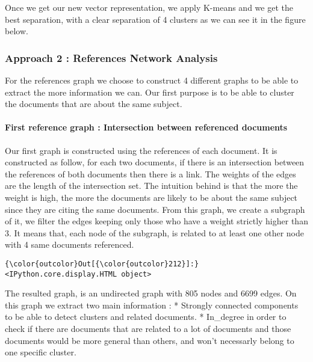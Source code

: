 \documentclass[journal,twocolumn]{IEEEtran}
\begin{document}
Once we get our new vector representation, we apply K-means and we get
the best separation, with a clear separation of 4 clusters as we can see
it in the figure below.


    \begin{figure}
        \begin{center}\end{center}
        \caption{}
        \label{}
    \end{figure}
    
    \subsubsection{Approach 2 : References Network
Analysis}\label{approach-2-references-network-analysis}

For the references graph we choose to construct 4 different graphs to be
able to extract the more information we can. Our first purpose is to be
able to cluster the documents that are about the same subject.

    \paragraph{First reference graph : Intersection between referenced
documents}\label{first-reference-graph-intersection-between-referenced-documents}

Our first graph is constructed using the references of each document. It
is constructed as follow, for each two documents, if there is an
intersection between the references of both documents then there is a
link. The weights of the edges are the length of the intersection set.
The intuition behind is that the more the weight is high, the more the
documents are likely to be about the same subject since they are citing
the same documents. From this graph, we create a subgraph of it, we
filter the edges keeping only those who have a weight strictly higher
than 3. It means that, each node of the subgraph, is related to at least
one other node with 4 same documents referenced.



\begin{Verbatim}[commandchars=\\\{\}]
{\color{outcolor}Out[{\color{outcolor}212}]:} <IPython.core.display.HTML object>
\end{Verbatim}
            
    The resulted graph, is an undirected graph with 805 nodes and 6699
edges. On this graph we extract two main information : * Strongly
connected components to be able to detect clusters and related
documents. * In\_degree in order to check if there are documents that
are related to a lot of documents and those documents would be more
general than others, and won't necessarly belong to one specific
cluster.
\end{document}

